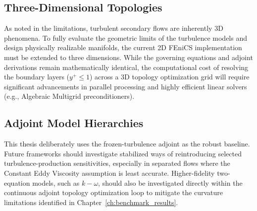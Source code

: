 \subsection{Three-Dimensional Topologies}
As noted in the limitations, turbulent secondary flows are inherently 3D phenomena. To fully evaluate the geometric limits of the turbulence models and design physically realizable manifolds, the current 2D FEniCS implementation must be extended to three dimensions. While the governing equations and adjoint derivations remain mathematically identical, the computational cost of resolving the boundary layers ($y^+ \le 1$) across a 3D topology optimization grid will require significant advancements in parallel processing and highly efficient linear solvers (e.g., Algebraic Multigrid preconditioners).

\subsection{Adjoint Model Hierarchies}
This thesis deliberately uses the frozen-turbulence adjoint as the robust baseline. Future frameworks should investigate stabilized ways of reintroducing selected turbulence-production sensitivities, especially in separated flows where the Constant Eddy Viscosity assumption is least accurate. Higher-fidelity two-equation models, such as $k-\omega$, should also be investigated directly within the continuous adjoint topology optimization loop to mitigate the curvature limitations identified in Chapter~\ref{ch:benchmark_results}. 
